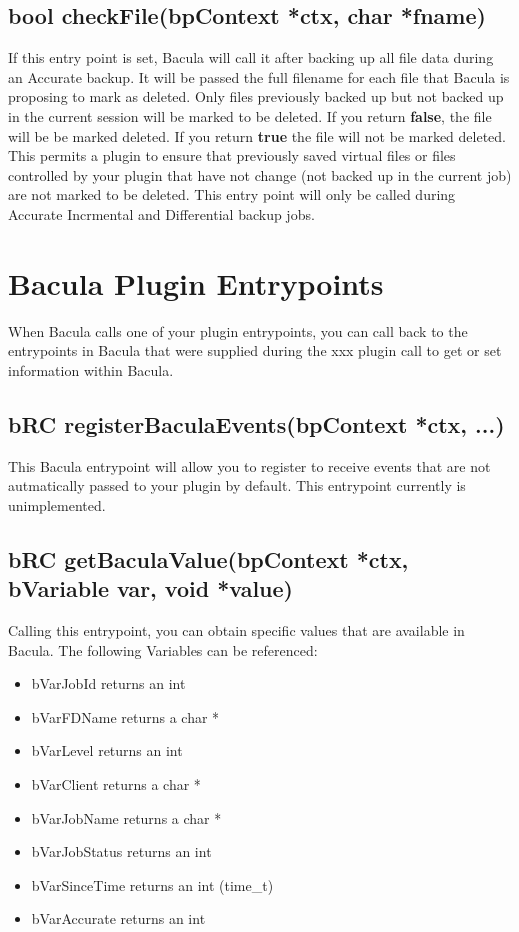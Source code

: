 \subsection{bool checkFile(bpContext *ctx, char *fname)}
If this entry point is set, Bacula will call it after backing up all file
data during an Accurate backup.  It will be passed the full filename for
each file that Bacula is proposing to mark as deleted.  Only files
previously backed up but not backed up in the current session will be
marked to be deleted.  If you return {\bf false}, the file will be be
marked deleted.  If you return {\bf true} the file will not be marked
deleted.  This permits a plugin to ensure that previously saved virtual
files or files controlled by your plugin that have not change (not backed
up in the current job) are not marked to be deleted.  This entry point will
only be called during Accurate Incrmental and Differential backup jobs.


\section{Bacula Plugin Entrypoints}
When Bacula calls one of your plugin entrypoints, you can call back to
the entrypoints in Bacula that were supplied during the xxx plugin call
to get or set information within Bacula.

\subsection{bRC registerBaculaEvents(bpContext *ctx, ...)}
This Bacula entrypoint will allow you to register to receive events
that are not autmatically passed to your plugin by default. This
entrypoint currently is unimplemented.

\subsection{bRC getBaculaValue(bpContext *ctx, bVariable var, void *value)}
Calling this entrypoint, you can obtain specific values that are available
in Bacula. The following Variables can be referenced:
\begin{itemize}
\item bVarJobId returns an int
\item bVarFDName returns a char *
\item bVarLevel returns an int
\item bVarClient returns a char *
\item bVarJobName returns a char *
\item bVarJobStatus returns an int
\item bVarSinceTime returns an int (time\_t)
\item bVarAccurate returns an int
\end{itemize}

